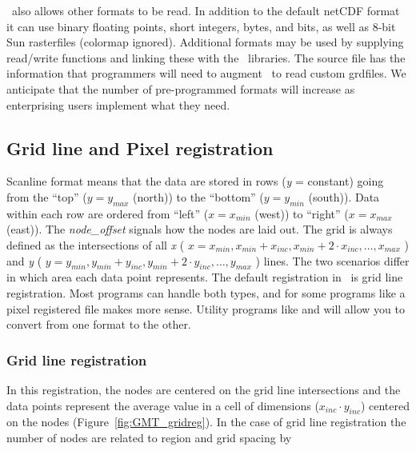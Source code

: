 
\GMT\ also allows other formats to be read.  In addition to
the default netCDF format it can use binary floating points, short
integers, bytes, and bits, as well as 8-bit Sun rasterfiles (colormap
ignored).   Additional formats may be used by supplying read/write
functions and linking these with the \GMT\ libraries.
The source file  has the information that
programmers will need to augment \GMT\ to read custom grdfiles.  We
anticipate that the number of pre-programmed formats will increase as
enterprising users implement what they need.

\subsection{Grid line and Pixel registration} 

Scanline format means that the data are stored in rows ({\it y} = constant)
going from the ``top'' ($y = y_{max}$ (north)) to the ``bottom''
($y = y_{min}$ (south)).  Data within each row are ordered from
``left'' ($x = x_{min}$ (west)) to ``right'' ($x = x_{max}$
(east)).  The {\it node\_offset} signals how the nodes are laid out.
The grid is always defined as the intersections of all {\it x}
( \( x = x_{min}, x_{min} + x_{inc}, x_{min} + 2 \cdot x_{inc}, \ldots, x_{max} \) )
and {\it y} ( \( y = y_{min}, y_{min} + y_{inc}, y_{min} + 2 \cdot y_{inc}, \ldots, y_{max} \) )
lines.  The two scenarios differ in which area each data point
represents.
The default registration in \GMT\ is grid line registration.  Most
programs can handle both types, and for some programs like 
a pixel registered file makes more sense.  Utility programs like
 and  will allow you to convert
from one format to the other.

\subsubsection{Grid line registration}

In this registration, the nodes are centered on the grid line
intersections and the data points represent the average value
in a cell of dimensions ($x_{inc} \cdot y_{inc}$) centered on the
nodes (Figure~\ref{fig:GMT_gridreg}).
In the case of grid line registration the number of nodes are
related to region and grid spacing by \\

